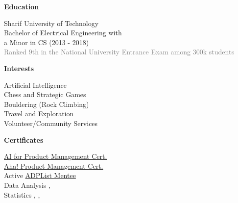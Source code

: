 \documentclass[a4paper,10.9pt]{article}
\newcommand{\sectiontitle}[1]{
  \begin{tcolorbox}[colback=black, colupper=white, sharp corners, boxrule=0pt, boxsep=3pt, left=0pt, right=0pt, top=1pt, bottom=1pt]
    \Large\bfseries #1
  \end{tcolorbox}
}
\newcommand{\graytext}[1]{\textcolor{grey}{#1}} %
\begin{document}
\vspace{7pt}
\begin{center}
\noindent\begin{minipage}{0.32\textwidth}
  \sectiontitle{Education}
  Sharif University of Technology\\
  Bachelor of Electrical Engineering with
  \\
  a Minor in CS \hfill (2013 - 2018)
  \\
  \graytext{{Ranked 9th} in the National University Entrance Exam among 300k students} 
\end{minipage}%
  \hfill
  \begin{minipage}{0.32\textwidth}
  \sectiontitle{Interests}
  Artificial Intelligence
  \\
  Chess and Strategic Games
  \\
  Bouldering (Rock Climbing)
  \\
  Travel and Exploration
  \\
  Volunteer/Community Services
  \end{minipage}%
  \hfill
\begin{minipage}{0.32\textwidth}
  \sectiontitle{Certificates}
  \href{https://www.credly.com/badges/d370d9c3-e34d-46f4-a4bf-ef5c8fc42cd1/linked_in_profile}{AI for Product Management Cert. \faExternalLink{}}\\
  \href{https://www.linkedin.com/learning/certificates/870c0fd2f066e7b8503e479c2490fafd5882f912ff675c28901dc0718ee39ed9}{Aha! Product Management Cert. \faExternalLink{}}\\
  Active \href{https://adplist.org/certifications/144451}{ADPList Mentee \faExternalLink{}} \\
  Data Analysis \href{https://www.linkedin.com/learning/certificates/ffca4d550b1e4b91b668313ff2bf815beb1a5e1ab6fd508e4ed9188aafe2db28?lipi=urn%3Ali%3Apage%3Ad_flagship3_profile_view_base_certifications_details%3BfdmfS%2FgnTKqHBLUxxTyUPQ%3D%3D}{\faExternalLink{}}, \href{https://www.linkedin.com/learning/certificates/cb5129fee28b086cddf3d21cbfeed021530abfbebfa7fa4a8f8964d9b7aa3c32?lipi=urn%3Ali%3Apage%3Ad_flagship3_profile_view_base_certifications_details%3BfdmfS%2FgnTKqHBLUxxTyUPQ%3D%3D}{\faExternalLink{}}\\
  Statistics \href{https://https://www.linkedin.com/learning/certificates/b30b4d5c833c3a100d3be45f7897425ec2152b81b473b240359e358ce2c128d8}{\faExternalLink{}}, \href{https://www.linkedin.com/learning/certificates/1d347521f9fc7171d89c71a1b1944ce84c5e74870d3e73956425be407dd61258}{\faExternalLink{}}, \href{https://www.linkedin.com/learning/certificates/6422926178665f0c37e9fd93754684319febdbfa2a3b75db1f243990005333f6}{\faExternalLink{}}\end{minipage}

\end{center}
\end{document}
